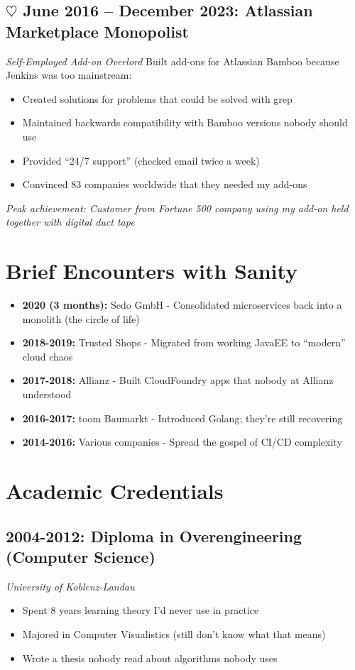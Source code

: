 \documentclass[11pt,a4paper]{article}
\newcommand{\heartstab}{{\color{heartcolor}$\heartsuit$}}
\newcommand{\antiemph}[1]{{\color{anticolor}\textbf{#1}}}
\begin{document}
\subsection{\texorpdfstring{\heartstab}{} June 2016 -- December 2023: Atlassian Marketplace Monopolist}
\textit{Self-Employed Add-on Overlord}
Built add-ons for Atlassian Bamboo because Jenkins was too mainstream:
\begin{itemize}[leftmargin=*,itemsep=0pt]
    \item Created solutions for problems that could be solved with grep
    \item Maintained backwards compatibility with Bamboo versions nobody should use
    \item Provided ``24/7 support'' (checked email twice a week)
    \item Convinced 83 companies worldwide that they needed my add-ons
\end{itemize}
\textit{Peak achievement: Customer from Fortune 500 company using my add-on held together with digital duct tape}
\section{Brief Encounters with Sanity}
\begin{itemize}[leftmargin=*,itemsep=0pt]
    \item \antiemph{2020 (3 months):} Sedo GmbH - Consolidated microservices back into a monolith (the circle of life)
    \item \antiemph{2018-2019:} Trusted Shops - Migrated from working JavaEE to ``modern'' cloud chaos
    \item \antiemph{2017-2018:} Allianz - Built CloudFoundry apps that nobody at Allianz understood
    \item \antiemph{2016-2017:} toom Baumarkt - Introduced Golang; they're still recovering
    \item \antiemph{2014-2016:} Various companies - Spread the gospel of CI/CD complexity
\end{itemize}
\section{Academic Credentials}
\subsection{2004-2012: Diploma in Overengineering (Computer Science)}
\textit{University of Koblenz-Landau}
\begin{itemize}[leftmargin=*,itemsep=0pt]
    \item Spent 8 years learning theory I'd never use in practice
    \item Majored in Computer Visualistics (still don't know what that means)
    \item Wrote a thesis nobody read about algorithms nobody uses
\end{itemize}
\end{document}
